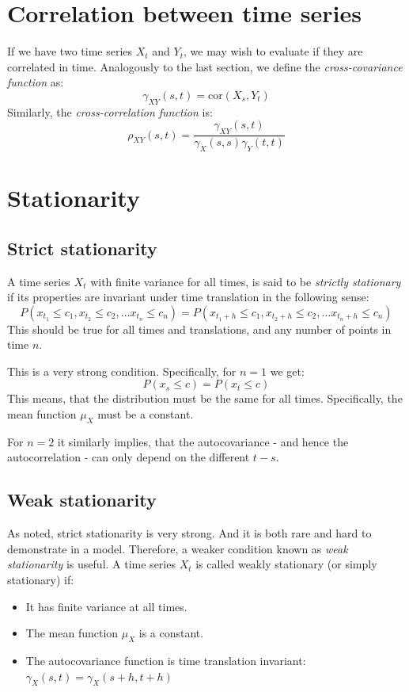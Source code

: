 \documentclass[12pt, a4paper]{article}
\numberwithin{equation}{section}
\begin{document}
\section{Correlation between time series}
If we have two time series $X_t$ and $Y_t$, we may wish to evaluate if they are correlated in time. Analogously to the last section, we define the \textit{cross-covariance function} as:
\begin{equation}
\gamma_{XY}(s,t)=\textrm{cor}(X_s,Y_t)
\end{equation}
Similarly, the \textit{cross-correlation function} is:
\begin{equation}
\rho_{XY}(s,t)=\frac{\gamma_{XY}(s,t)}{\gamma_X(s,s)\gamma_Y(t,t)}
\end{equation}

\section{Stationarity}

\subsection{Strict stationarity}
A time series $X_t$ with finite variance for all times, is said to be \textit{strictly stationary} if its properties are invariant under time translation in the following sense:
\begin{equation}
\label{strict_stationarity}
P(x_{t_1}\le c_1,x_{t_2}\le c_2,\ldots x_{t_n}\le c_n)=P(x_{t_1+h}\le c_1,x_{t_2+h}\le c_2,\ldots x_{t_n+h}\le c_n)
\end{equation}
This should be true for all times and translations, and any number of points in time $n$.

This is a very strong condition. Specifically, for $n=1$ we get:
\begin{equation}
P(x_s\le c)=P(x_t\le c)
\end{equation}
This means, that the distribution must be the same for all times. Specifically, the mean function $\mu_X$ must be a constant.

For $n=2$ it similarly implies, that the autocovariance - and hence the autocorrelation - can only depend on the different $t-s$.

\subsection{Weak stationarity}
As noted, strict stationarity is very strong. And it is both rare and hard to demonstrate in a model. Therefore, a weaker condition known as \textit{weak stationarity} is useful. A time series $X_t$ is called weakly stationary (or simply stationary) if:
\begin{itemize}
\item It has finite variance at all times.
\item The mean function $\mu_X$ is a constant.
\item The autocovariance function is time translation invariant: $\gamma_X(s,t)=\gamma_X(s+h,t+h)$
\end{itemize}
\end{document}
